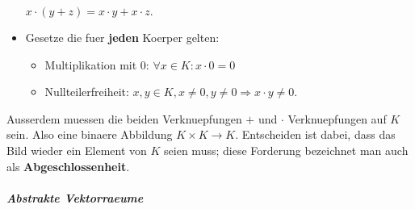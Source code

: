 \documentclass[12pt]{article}
\begin{document}
\begin{flushleft}
\begin{itemize}
            $x \cdot (y + z) = x \cdot y + x \cdot z.$
        \item Gesetze die fuer \textbf{jeden} Koerper gelten:
        \begin{itemize}
            \item Multiplikation mit 0:
                $\forall x \in K: x \cdot 0 = 0$
            \item Nullteilerfreiheit:
                $x,y \in K, x \not = 0, y \not = 0 \Rightarrow x \cdot y \not = 0.$
        \end{itemize}
    \end{itemize}
    Ausserdem muessen die beiden Verknuepfungen $+$ und $\cdot$ Verknuepfungen auf $K$ sein. Also eine binaere Abbildung $K \times K \rightarrow K$.
    Entscheiden ist dabei, dass das Bild wieder ein Element von $K$ seien muss; diese Forderung bezeichnet man auch als \textbf{Abgeschlossenheit}.
\end{flushleft}
\vspace{1cm}
\subparagraph{\large Abstrakte Vektorraeume}
\normalsize
\end{document}
